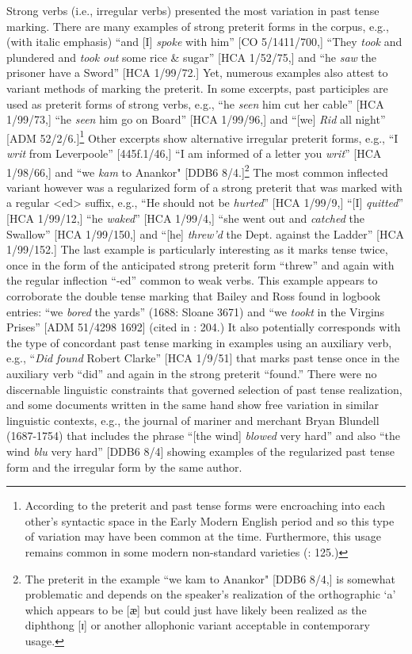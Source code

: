 Strong verbs (i.e., irregular verbs) presented the most variation in past tense marking. There are many examples of strong preterit forms in the corpus, e.g., (with italic emphasis) “and [I] \textit{spoke} with him” [CO 5/1411/700,] “They \textit{took} and plundered and \textit{took} \textit{out} some rice \& sugar” [HCA 1/52/75,] and “he \textit{saw} the prisoner have a Sword” [HCA 1/99/72.] Yet, numerous examples also attest to variant methods of marking the preterit. In some excerpts, past participles are used as preterit forms of strong verbs, e.g., “he \textit{seen} him cut her cable” [HCA 1/99/73,] “he \textit{seen} him go on Board” [HCA 1/99/96,] and “[we] \textit{Rid} all night” [ADM 52/2/6.]\footnote{According to \citet[95]{Blake2002} the preterit and past tense forms were encroaching into each other’s syntactic space in the Early Modern English period and so this type of variation may have been common at the time. Furthermore, this usage remains common in some modern non-standard varieties (\citealt{Cheshire1994}: 125.)} Other excerpts show alternative irregular preterit forms, e.g., “I \textit{writ} from Leverpoole” [445f.1/46,] “I am informed of a letter you \textit{writ}” [HCA 1/98/66,] and “we \textit{kam} to Anankor" [DDB6 8/4.]\footnote{The preterit in the example “we kam to Anankor" [DDB6 8/4,] is somewhat problematic and depends on the speaker’s realization of the orthographic ‘a’ which appears to be [{ӕ] but could just have likely been realized as the diphthong [{ɪ}] or another allophonic variant acceptable in contemporary usage.} } The most common inflected variant however was a regularized form of a strong preterit that was marked with a regular <ed> suffix, e.g., “He should not be \textit{hurted}” [HCA 1/99/9,] “[I] \textit{quitted}” [HCA 1/99/12,] “he \textit{waked}” [HCA 1/99/4,] “she went out and \textit{catched} the Swallow” [HCA 1/99/150,] and “[he] \textit{threw’d} the Dept. against the Ladder” [HCA 1/99/152.] The last example is particularly interesting as it marks tense twice, once in the form of the anticipated strong preterit form “threw” and again with the regular inflection “-ed” common to weak verbs. This example appears to corroborate the double tense marking that Bailey and Ross found in logbook entries: “we \textit{bored} the yards” (1688: Sloane 3671) and “we \textit{tookt} in the Virgins Prises” [ADM 51/4298 1692] (cited in \citealt{BaileyRoss1988}: 204.) It also potentially corresponds with the type of concordant past tense marking in examples using an auxiliary verb, e.g., “\textit{Did} \textit{found} Robert Clarke” [HCA 1/9/51] that marks past tense once in the auxiliary verb “did” and again in the strong preterit “found.” There were no discernable linguistic constraints that governed selection of past tense realization, and some documents written in the same hand show free variation in similar linguistic contexts, e.g., the journal of mariner and merchant Bryan Blundell (1687-1754) that includes the phrase “[the wind] \textit{blowed} very hard” and also “the wind \textit{blu} very hard” [DDB6 8/4] showing examples of the regularized past tense form and the irregular form by the same author. 

